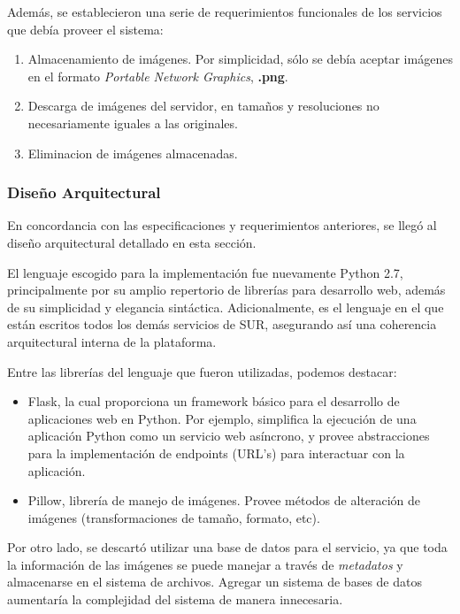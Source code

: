 \documentclass[11pt,letterpaper]{article}
\begin{document}
Además, se establecieron una serie de requerimientos funcionales de los servicios que debía proveer el sistema:
\begin{enumerate}
    \item Almacenamiento de imágenes. Por simplicidad, sólo se debía aceptar imágenes en el formato \emph{Portable Network Graphics}, \textbf{.png}.
    \item Descarga de imágenes del servidor, en tamaños y resoluciones no necesariamente iguales a las originales.
    \item Eliminacion de imágenes almacenadas.
\end{enumerate}
\newpage
\subsubsection{Diseño Arquitectural}

En concordancia con las especificaciones y requerimientos anteriores, se llegó al diseño arquitectural detallado en esta sección.

El lenguaje escogido para la implementación fue nuevamente Python 2.7, principalmente por su amplio repertorio de librerías para desarrollo web, además de su simplicidad y elegancia sintáctica. Adicionalmente, es el lenguaje en el que están escritos todos los demás servicios de SUR, asegurando así una coherencia arquitectural interna de la plataforma.

Entre las librerías del lenguaje que fueron utilizadas, podemos destacar:
\begin{itemize}
    \item Flask\cite{flask}, la cual proporciona un framework básico para el desarrollo de aplicaciones web en Python. Por ejemplo, simplifica la ejecución de una aplicación Python como un servicio web asíncrono, y provee abstracciones para la implementación de endpoints (URL's) para interactuar con la aplicación.
    \item Pillow\cite{pillow}, librería de manejo de imágenes. Provee métodos de alteración de imágenes (transformaciones de tamaño, formato, etc).
\end{itemize}

Por otro lado, se descartó utilizar una base de datos para el servicio, ya que toda la información de las imágenes se puede manejar a través de \emph{metadatos} y almacenarse en el sistema de archivos. Agregar un sistema de bases de datos aumentaría la complejidad del sistema de manera innecesaria.\\
\end{document}
